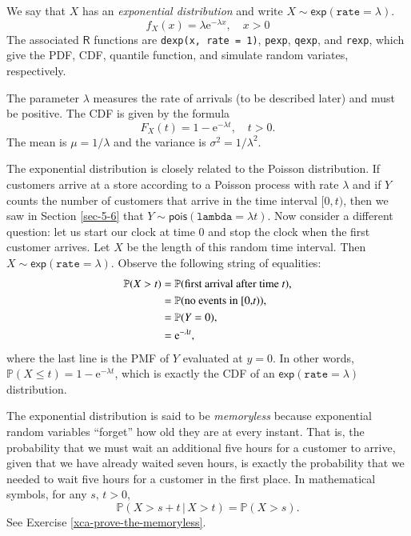 \documentclass[captions=tableheading]{scrbook}
\begin{document}
We say that \(X\) has an \emph{exponential distribution} and write \(X\sim\mathsf{exp}(\mathtt{rate}=\lambda)\). 
\begin{equation}
f_{X}(x)=\lambda\mathrm{e}^{-\lambda x},\quad x>0
\end{equation}
The associated \(\mathsf{R}\) functions are \texttt{dexp(x, rate = 1)}, \texttt{pexp}, \texttt{qexp}, and \texttt{rexp}, which give the PDF, CDF, quantile function, and simulate random variates, respectively.

The parameter \(\lambda\) measures the rate of arrivals (to be described later) and must be positive. The CDF is given by the formula
\begin{equation}
F_{X}(t)=1-\mathrm{e}^{-\lambda t},\quad t>0.
\end{equation}
The mean is \(\mu=1/\lambda\) and the variance is \(\sigma^{2}=1/\lambda^{2}\). 

The exponential distribution is closely related to the Poisson distribution. If customers arrive at a store according to a Poisson process with rate \(\lambda\) and if \(Y\) counts the number of customers that arrive in the time interval \([0,t)\), then we saw in Section \ref{sec-5-6} that \( Y \sim \mathsf{pois}(\mathtt{lambda}=\lambda t). \) Now consider a different question: let us start our clock at time 0 and stop the clock when the first customer arrives. Let \(X\) be the length of this random time interval. Then \(X\sim\mathsf{exp}(\mathtt{rate}=\lambda)\). Observe the following string of equalities:
\begin{align*}
\mathbb{P}(X>t) & =\mathbb{P}(\mbox{first arrival after time \emph{t}}),\\
 & =\mathbb{P}(\mbox{no events in [0,\emph{t})}),\\
 & =\mathbb{P}(Y=0),\\
 & =\mathrm{e}^{-\lambda t},
\end{align*}
where the last line is the PMF of \(Y\) evaluated at \(y=0\). In other words, \(\mathbb{P}(X\leq t)=1-\mathrm{e}^{-\lambda t}\), which is exactly the CDF of an \(\mathsf{exp}(\mathtt{rate}=\lambda)\) distribution. 

The exponential distribution is said to be \emph{memoryless} because exponential random variables ``forget'' how old they are at every instant. That is, the probability that we must wait an additional five hours for a customer to arrive, given that we have already waited seven hours, is exactly the probability that we needed to wait five hours for a customer in the first place. In mathematical symbols, for any \(s,\, t>0\),
\begin{equation}
\mathbb{P}(X>s+t\,|\, X>t)=\mathbb{P}(X>s).
\end{equation}
See Exercise \ref{xca-prove-the-memoryless}.
\end{document}
